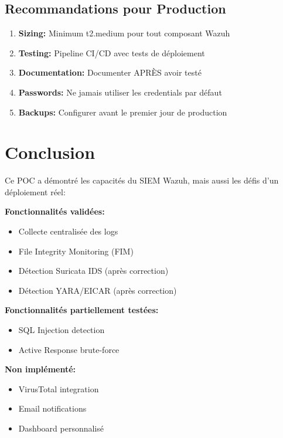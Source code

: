\documentclass[12pt,a4paper]{article}
\begin{document}
\subsection{Recommandations pour Production}

\begin{enumerate}
    \item \textbf{Sizing:} Minimum t2.medium pour tout composant Wazuh
    \item \textbf{Testing:} Pipeline CI/CD avec tests de déploiement
    \item \textbf{Documentation:} Documenter APRÈS avoir testé
    \item \textbf{Passwords:} Ne jamais utiliser les credentials par défaut
    \item \textbf{Backups:} Configurer avant le premier jour de production
\end{enumerate}

\section{Conclusion}

Ce POC a démontré les capacités du SIEM Wazuh, mais aussi les défis d'un déploiement réel:

\textbf{Fonctionnalités validées:}
\begin{itemize}
    \item Collecte centralisée des logs
    \item File Integrity Monitoring (FIM)
    \item Détection Suricata IDS (après correction)
    \item Détection YARA/EICAR (après correction)
\end{itemize}

\textbf{Fonctionnalités partiellement testées:}
\begin{itemize}
    \item SQL Injection detection
    \item Active Response brute-force
\end{itemize}

\textbf{Non implémenté:}
\begin{itemize}
    \item VirusTotal integration
    \item Email notifications
    \item Dashboard personnalisé
\end{itemize}
\end{document}
